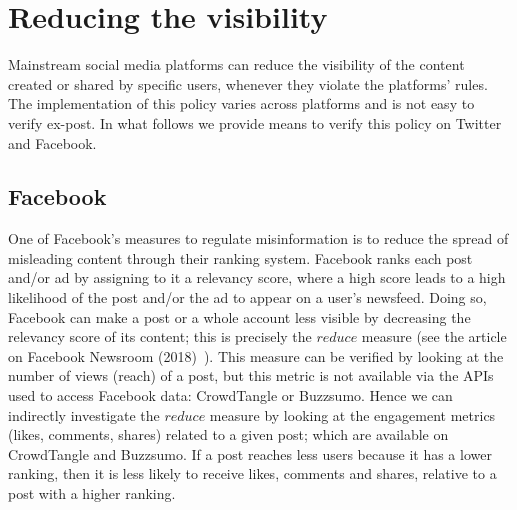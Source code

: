 \documentclass{article}
\begin{document}

%





\section{Reducing the visibility}

Mainstream social media platforms can reduce the visibility of the content created or shared by specific users, whenever they violate the platforms' rules. The implementation of this policy varies across platforms and is not easy to verify ex-post. In what follows we provide means to verify this policy on Twitter and Facebook. 
 

\subsection{Facebook} \label{reduce_fb}


One of Facebook’s measures to regulate misinformation is to reduce the spread of misleading content through their ranking system. Facebook ranks each post and/or ad by assigning to it a relevancy score, where a high score leads to a high likelihood of the post and/or the ad to appear on a user's newsfeed. Doing so, Facebook can make a post or a whole account less visible by decreasing the relevancy score of its content; this is precisely the $reduce$ measure (see the article on Facebook Newsroom (2018)~\cite{newsroom2}). This measure can be verified by looking at the number of views (reach) of a post, but this metric is not available via the APIs used to access Facebook data: CrowdTangle or Buzzsumo. Hence we can indirectly investigate the $reduce$ measure by looking at the engagement metrics (likes, comments, shares) related to a given post; which are available on CrowdTangle and Buzzsumo. If a post reaches less users because it has a lower ranking, then it is less likely to receive likes, comments and shares, relative to a post with a higher ranking. 

\end{document}
